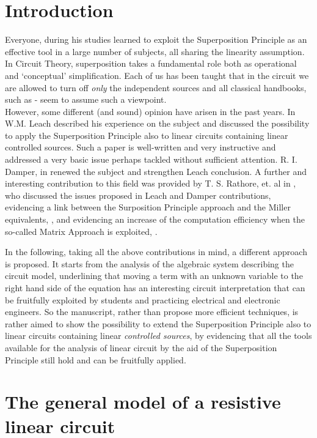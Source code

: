 \documentclass[10pt]{amsart}
\begin{document}
\section{Introduction}
Everyone, during his studies learned to exploit the Superposition Principle as an effective tool in a large number of subjects, all sharing the linearity assumption. In Circuit Theory, superposition takes a fundamental role both as operational and `conceptual' simplification. Each of us has been taught that in the circuit we are allowed to turn off \emph{only} the independent sources and all classical handbooks, such as \cite{Chua}-\cite{Nilsson} seem to assume such a viewpoint.\\
However, some different (and sound) opinion have arisen in the past years. In \cite{M-L-94} W.M. Leach described his experience on the subject and discussed the possibility to apply the Superposition Principle also to linear circuits containing linear controlled sources. Such a paper is well-written and very instructive and addressed a very basic issue perhaps tackled without sufficient attention. R. I. Damper, in \cite{Damper_11} renewed the subject and strengthen Leach conclusion. A further and interesting contribution to this field was provided by T. S. Rathore, et. al in \cite{Rathore_12}, who discussed the issues proposed in Leach and Damper contributions, evidencing a link between the Surposition Principle approach and the Miller equivalents, \cite{Rathore_2010_1}, and evidencing an increase of the computation efficiency when the so-called Matrix Approach is exploited, \cite{Rathore_2010_2}.

In the following, taking all the above contributions in mind, a different approach is proposed. It starts from the analysis of the algebraic system describing the circuit model, underlining that moving a term with an unknown variable to the right hand side of the equation has an interesting circuit interpretation that can be fruitfully exploited by students and practicing electrical and electronic engineers. So the manuscript, rather than propose more efficient techniques, is rather aimed to show the possibility to extend the Superposition Principle also to linear circuits containing linear \emph{controlled sources}, by evidencing that all the tools available for the analysis of linear circuit by the aid of the Superposition Principle still hold and can be fruitfully applied.

\section{The general model of a resistive linear circuit}
\end{document}
